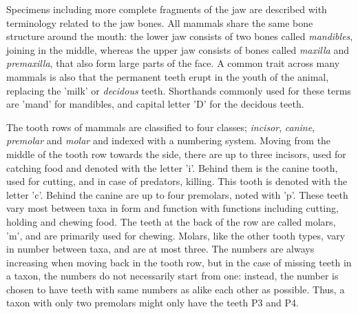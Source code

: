 \documentclass{article}
\begin{document}
Specimens including more complete fragments of the jaw are described with terminology related 
to the jaw bones. All mammals share the same bone structure around the mouth: the lower jaw consists 
of two bones called \textit{mandibles}, joining in the middle, whereas the upper jaw consists of bones called 
\textit{maxilla} and \textit{premaxilla}, that also form large parts of the face.
A common trait across many mammals is also that the permanent teeth erupt in the 
youth of the animal, replacing the 'milk' or \textit{decidous} teeth. Shorthands commonly used for these 
terms are 'mand' for mandibles, and capital letter 'D' for the decidous teeth.

The tooth rows of mammals are classified to four classes; \textit{incisor}, \textit{canine}, \textit{premolar}
and \textit{molar} and indexed with a numbering system. Moving from the middle of the tooth row
towards the side, there are up to three 
incisors, used for catching food and denoted with the letter 'i'. Behind them is the canine tooth, used for cutting, and 
in case of predators, killing. This tooth is denoted with the letter 'c'. Behind the canine are up to four premolars, noted with 'p'. These 
teeth vary most between taxa in form and function with functions including cutting, holding and chewing food.
The teeth at the back of the row are called molars, 'm', and are primarily used for chewing. Molars, like the other tooth types, 
vary in number between taxa, and are at most three. The numbers are always increasing when moving back in the tooth row, but in
 the case of missing teeth in a taxon, the numbers do not necessarily start from one: instead, the number is chosen to 
have teeth with same numbers as alike each other as possible. Thus, a taxon with only two premolars might only have the teeth P3 and P4.
\end{document}
